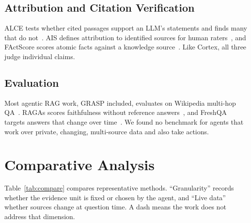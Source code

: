 \documentclass[conference]{IEEEtran}
\begin{document}
\subsection{Attribution and Citation Verification}
ALCE tests whether cited passages support an LLM's statements and finds many that do not~\cite{gao2023alce}. AIS defines attribution to identified sources for human raters~\cite{rashkin2023ais}, and FActScore scores atomic facts against a knowledge source~\cite{min2023factscore}. Like Cortex, all three judge individual claims.

\subsection{Evaluation}
Most agentic RAG work, GRASP included, evaluates on Wikipedia multi-hop QA~\cite{yang2018hotpotqa,ho2020twowiki,trivedi2022musique}. RAGAs scores faithfulness without reference answers~\cite{es2024ragas}, and FreshQA targets answers that change over time~\cite{vu2024freshllms}. We found no benchmark for agents that work over private, changing, multi-source data and also take actions.

\section{Comparative Analysis}
\label{sec:compare}

Table~\ref{tab:compare} compares representative methods. ``Granularity'' records whether the evidence unit is fixed or chosen by the agent, and ``Live data'' whether sources change at question time. A dash means the work does not address that dimension.
\end{document}
